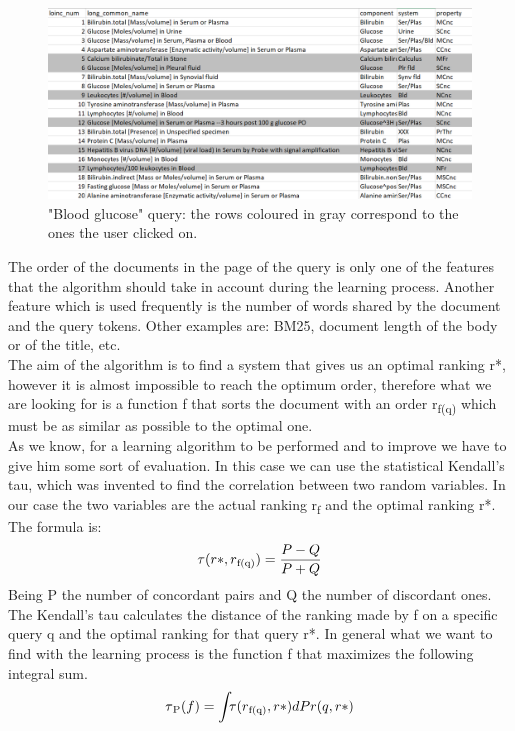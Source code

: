 \documentclass{article}
\begin{document}
\begin{figure}[h]
    \centering
    \includegraphics[scale=0.3]{Blood glucose query.png}
    \caption{"Blood glucose" query: the rows coloured in gray correspond to the ones the user clicked on.}
    \label{fig:bloodglucose}
\end{figure}

The order of the documents in the page of the query is only one of the features that the algorithm should take in account during the learning process. Another feature which is used frequently is the number of words shared by the document and the query tokens. Other examples are: BM25, document length of the body or of the title, etc.\\

The aim of the algorithm is to find a system that gives us an optimal ranking r*, however it is almost impossible to reach the optimum order, therefore what we are looking for is a function f that sorts the document with an order r\textsubscript{f(q)} which must be as similar as possible to the optimal one.\\

As we know, for a learning algorithm to be performed and to improve we have to give him some sort of evaluation. In this case we can use the statistical Kendall's tau, which was invented to find the correlation between two random variables. In our case the two variables are the actual ranking r\textsubscript{f} and the optimal ranking r*. The formula is:
\[\tau( r*,  r\textsubscript{f(q)}) = \frac{P-Q}{P+Q}\]
Being P the number of concordant pairs and Q the number of discordant ones.\\

The Kendall's tau calculates the distance of the ranking made by f on a specific query q and the optimal ranking for that query r*. In general what we want to find with the learning process is the function f that maximizes the following integral sum.
\[\tau\textsubscript{P}(f) = \int_{}{} \tau(r\textsubscript{f(q)},r*)dPr(q,r*)\]
\end{document}
